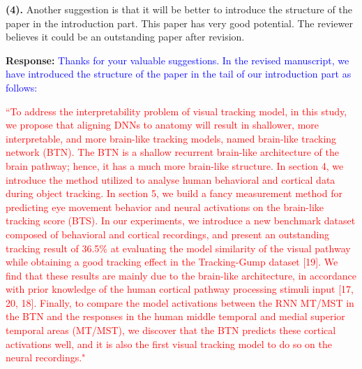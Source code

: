 \documentclass[12pt,journal,onecolumn]{IEEEtran}
\begin{document}


\textbf{(4).} Another suggestion is that it will be better to introduce the structure of the paper in the introduction part.
This paper has very good potential. 
The reviewer believes it could be an outstanding paper after revision.

\textbf{Response:} \textcolor{blue}{Thanks for your valuable suggestions.
In the revised manuscript, we have introduced the structure of the paper in the tail of our introduction part as follows:
}

\textcolor{red}{
``To address the interpretability problem of visual tracking model, in this study, we propose that aligning DNNs to anatomy will result in shallower, more interpretable, and more brain-like tracking models, named brain-like tracking network (BTN). 
The BTN is a shallow recurrent brain-like architecture of the brain pathway; hence, it has a much more brain-like structure. In section 4, we introduce the method utilized to analyse human behavioral and cortical data during object tracking. In section 5, we build a fancy measurement method for predicting eye movement behavior and neural activations on the brain-like tracking score (BTS).
In our experiments, we introduce a new benchmark dataset composed of behavioral and cortical recordings, and present an outstanding tracking result of 36.5\% at evaluating the model similarity of the visual pathway while obtaining a good tracking effect in the Tracking-Gump dataset [19]. 
We find that these results are mainly due to the brain-like architecture, in accordance with prior knowledge of the human cortical pathway processing stimuli input [17, 20, 18]. 
Finally, to compare the model activations between the RNN MT/MST in the BTN and the responses in the human middle temporal and medial superior temporal areas (MT/MST), we discover that the BTN predicts these cortical activations well, and it is also the first visual tracking model to do so on the neural recordings." 
} 

\vspace{8pt}
\end{document}
